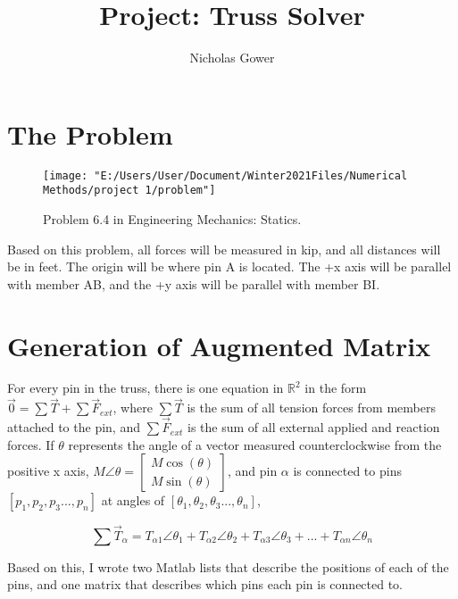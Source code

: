 \documentclass[9pt,letterpaper]{article}
\begin{document}
	\title{Project: Truss Solver}
	
	\author{Nicholas Gower}
	
	\maketitle
	\section{The Problem}
	
	\begin{figure}[h!]
		\centering
		\texttt{[image: "E:/Users/User/Document/Winter2021Files/Numerical Methods/project 1/problem"]}
		\caption{Problem 6.4 in Engineering Mechanics: Statics.}
		\label{fig:problem}
	\end{figure}
	
	Based on this problem, all forces will be measured in kip, and all distances will be in feet. The origin will be where pin A is located. The +x axis will be parallel with member AB, and the +y axis will be parallel with member BI.
	\section{Generation of Augmented Matrix}
		For every pin in the truss, there is one equation in $ \mathbb{R}^2 $ in the form
		$  \vec{0}=\sum{\vec{T}}+\sum{\vec{F}_{ext}}   $,	where $\sum{\vec{T}}$ is the sum of all tension forces from members attached to the pin, and $\sum{\vec{F}_{ext}}$ is the sum of all external applied and reaction forces.
		If $\theta$ represents the angle of a vector measured counterclockwise from the positive x axis, $ M\angle\theta=
	  \begin{bmatrix}
	  	M\cos(\theta) \\
	  	M\sin(\theta)
	  \end{bmatrix} $, and pin $\alpha$ is connected to pins $[p_1,p_2,p_3...,p_n]$ at angles of $[\theta_1,\theta_2,\theta_3...,\theta_n]$,
	  
	  \[ \sum{\vec{T}_{\alpha}}=T_{\alpha1}\angle\theta_1 +T_{\alpha2}\angle\theta_2 + T_{\alpha3}\angle\theta_3 + ... + T_{\alpha n}\angle\theta_n \]
	  
	  Based on this, I wrote two Matlab lists that describe the positions of each of the pins, and one matrix that describes which pins each pin is connected to.
	  
\end{document}
